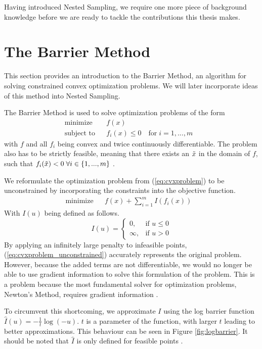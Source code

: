 \documentclass[12pt, a4paper]{report}
\begin{document}
Having introduced Nested Sampling, we require one more piece of background knowledge before we are ready to tackle the contributions this thesis makes.
\FloatBarrier
\section{The Barrier Method}
This section provides an introduction to the Barrier Method, an algorithm for solving constrained convex optimization problems.
We will later incorporate ideas of this method into Nested Sampling.

The Barrier Method is used to solve optimization problems of the form
\begin{align}
    &\textrm{minimize} && f(x) && \nonumber\\
    &\textrm{subject to}  && f_i(x) \leq 0 \quad \textrm{for} \; i=1,...,m &&
    \label{eq:cvxproblem}
\end{align}
with $f$ and all $f_i$ being convex and twice continuously differentiable.
The problem also has to be strictly feasible, meaning that there exists an $\Tilde{x}$ in the domain of $f$, such that $f_i(\Tilde{x}) < 0 \; \forall i \in \{1,...,m\}$ \cite[561]{boyd}.

We reformulate the optimization problem from (\ref{eq:cvxproblem}) to be unconstrained by incorporating the constraints into the objective function.
\begin{align}
    &\textrm{minimize} && f(x) + \sum_{i=1}^m I(f_i(x))&& \label{eq:cvxproblem_unconstrained}
\end{align}
With $I(u)$ being defined as follows.
$$
I(u) = \begin{cases}
        0,      & \text{if }  u \leq 0\\
        \infty, & \text{if }  u > 0
        \end{cases}
$$
By applying an infinitely large penalty to infeasible points, (\ref{eq:cvxproblem_unconstrained}) accurately represents the original problem.
However, because the added terms are not differentiable, we would no longer be able to use gradient information to solve this formulation of the problem.
This is a problem because the most fundamental solver for optimization problems, Newton's Method, requires gradient information \cite[563]{boyd}.

To circumvent this shortcoming, we approximate $I$ using the log barrier function $\hat{I}(u)= -\frac{1}{t}\log(-u)$. $t$ is a parameter of the function, with larger $t$ leading to better approximations.
This behaviour can be seen in Figure \ref{fig:logbarrier}.
It should be noted that $\hat{I}$ is only defined for feasible points \cite[563]{boyd}.
\end{document}
